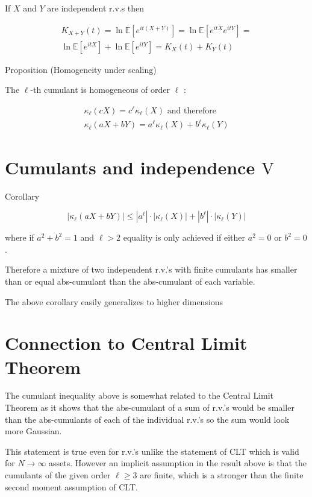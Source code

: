 \documentclass[11pt]{article}
\theoremstyle{plain} %
\theoremstyle{remark}
\begin{document}
If $X$ and $Y$ are independent r.v.s then

$$
\begin{gathered}
K_{X+Y}(t)=\ln \mathbb{E}\left[e^{i t(X+Y)}\right]=\ln \mathbb{E}\left[e^{i t X} e^{i t Y}\right]= \\
\ln \mathbb{E}\left[e^{i t X}\right]+\ln \mathbb{E}\left[e^{i t Y}\right]=K_{X}(t)+K_{Y}(t)
\end{gathered}
$$

Proposition (Homogeneity under scaling)

The $\ell$-th cumulant is homogeneous of order $\ell$ :

$$
\begin{gathered}
\kappa_{\ell}(c X)=c^{\ell} \kappa_{\ell}(X) \text { and therefore } \\
\kappa_{\ell}(a X+b Y)=a^{\ell} \kappa_{\ell}(X)+b^{\ell} \kappa_{\ell}(Y)
\end{gathered}
$$

\section*{Cumulants and independence $\mathrm{V}$} Corollary

$$
\left|\kappa_{\ell}(a X+b Y)\right| \leq\left|a^{\ell}\right| \cdot\left|\kappa_{\ell}(X)\right|+\left|b^{\ell}\right| \cdot\left|\kappa_{\ell}(Y)\right|
$$

where if $a^{2}+b^{2}=1$ and $\ell>2$ equality is only achieved if either
$a^{2}=0$ or $b^{2}=0$.

Therefore a mixture of two independent r.v.'s with finite cumulants has smaller
than or equal abs-cumulant than the abs-cumulant of each variable.

The above corollary easily generalizes to higher dimensions

\section*{Connection to Central Limit Theorem}
The cumulant inequality above is somewhat related to the Central Limit Theorem
as it shows that the abs-cumulant of a sum of r.v.'s would be smaller than the
abs-cumulants of each of the individual r.v.'s so the sum would look more
Gaussian.

This statement is true even for r.v.'s unlike the statement of CLT which is
valid for $N \rightarrow \infty$ assets. However an implicit assumption in the
result above is that the cumulants of the given order $\ell \geq 3$ are finite,
which is a stronger than the finite second moment assumption of CLT.
\end{document}
